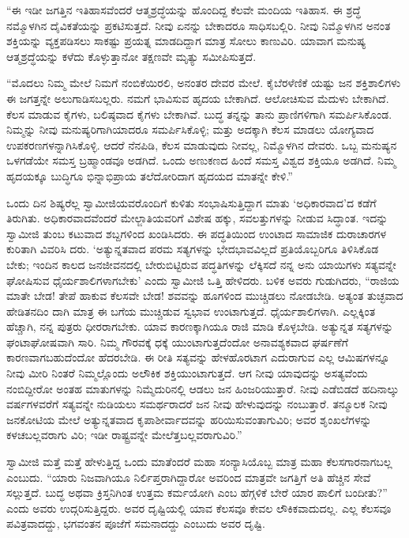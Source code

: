 “ಈ ಇಡೀ ಜಗತ್ತಿನ ಇತಿಹಾಸವೆಂದರೆ ಆತ್ಮಶ್ರದ್ಧೆಯನ್ನು ಹೊಂದಿದ್ದ ಕೆಲವೇ ಮಂದಿಯ ಇತಿಹಾಸ. ಈ ಶ್ರದ್ಧೆ ನಮ್ಮೊಳಗಿನ ದೈವಿಕತೆಯನ್ನು ಪ್ರಕಟಿಸುತ್ತದೆ. ನೀವು ಏನನ್ನು ಬೇಕಾದರೂ ಸಾಧಿಸಬಲ್ಲಿರಿ. ನೀವು ನಿಮ್ಮೊಳಗಿನ ಅನಂತ ಶಕ್ತಿಯನ್ನು ವ್ಯಕ್ತಪಡಿಸಲು ಸಾಕಷ್ಟು ಪ್ರಯತ್ನ ಮಾಡದಿದ್ದಾಗ ಮಾತ್ರ ಸೋಲು ಕಾಣುವಿರಿ. ಯಾವಾಗ ಮನುಷ್ಯ ಆತ್ಮಶ್ರದ್ಧೆಯನ್ನು ಕಳೆದು ಕೊಳ್ಳುತ್ತಾನೋ ತಕ್ಷಣವೇ ಮೃತ್ಯು ಸಮೀಪಿಸುತ್ತದೆ.

“ಮೊದಲು ನಿಮ್ಮ ಮೇಲೆ ನಿಮಗೆ ನಂಬಿಕೆಯಿರಲಿ, ಅನಂತರ ದೇವರ ಮೇಲೆ. ಕೈಬೆರಳೆಣಿಕೆ ಯಷ್ಟು ಜನ ಶಕ್ತಿಶಾಲಿಗಳು ಈ ಜಗತ್ತನ್ನೇ ಅಲುಗಾಡಿಸಬಲ್ಲರು. ನಮಗೆ ಭಾವಿಸುವ ಹೃದಯ ಬೇಕಾಗಿದೆ. ಆಲೋಚಿಸುವ ಮೆದುಳು ಬೇಕಾಗಿದೆ. ಕೆಲಸ ಮಾಡುವ ಕೈಗಳು, ಬಲಿಷ್ಠವಾದ ಕೈಗಳು ಬೇಕಾಗಿವೆ. ಬುದ್ಧ ತನ್ನನ್ನು ತಾನು ಪ್ರಾಣಿಗಳಿಗಾಗಿ ಸಮರ್ಪಿಸಿಕೊಂಡ. ನಿಮ್ಮನ್ನು ನೀವು ಮನುಷ್ಯರಿಗಾಗಿಯಾದರೂ ಸಮರ್ಪಿಸಿಕೊಳ್ಳಿ; ಮತ್ತು ಅದಕ್ಕಾಗಿ ಕೆಲಸ ಮಾಡಲು ಯೋಗ್ಯವಾದ ಉಪಕರಣಗಳನ್ನಾಗಿಸಿಕೊಳ್ಳಿ. ಆದರೆ ನೆನಪಿಡಿ, ಕೆಲಸ ಮಾಡುವುದು ನೀವಲ್ಲ, ನಿಮ್ಮೊಳಗಿನ ದೇವರು. ಒಬ್ಬ ಮನುಷ್ಯನ ಒಳಗಡೆಯೇ ಸಮಸ್ತ ಬ್ರಹ್ಮಾಂಡವೂ ಅಡಗಿದೆ. ಒಂದು ಅಣುಕಣದ ಹಿಂದೆ ಸಮಸ್ತ ವಿಶ್ವದ ಶಕ್ತಿಯೂ ಅಡಗಿದೆ. ನಿಮ್ಮ ಹೃದಯಕ್ಕೂ ಬುದ್ಧಿಗೂ ಭಿನ್ನಾಭಿಪ್ರಾಯ ತಲೆದೋರಿದಾಗ ಹೃದಯದ ಮಾತನ್ನೇ ಕೇಳಿ.”

ಒಂದು ದಿನ ಶಿಷ್ಯರೆಲ್ಲ ಸ್ವಾಮೀಜಿಯವರೊಂದಿಗೆ ಕುಳಿತು ಸಂಭಾಷಿಸುತ್ತಿದ್ದಾಗ ಮಾತು ‘ಅಧಿಕಾರವಾದ’ದ ಕಡೆಗೆ ತಿರುಗಿತು. ಅಧಿಕಾರವಾದವೆಂದರೆ ಮೇಲ್ಜಾತಿಯವರಿಗೆ ವಿಶೇಷ ಹಕ್ಕು, ಸವಲತ್ತುಗಳನ್ನು ನೀಡುವ ಸಿದ್ಧಾಂತ. ಇದನ್ನು ಸ್ವಾಮೀಜಿ ತುಂಬ ಕಟುವಾದ ಶಬ್ದಗಳಿಂದ ಖಂಡಿಸಿದರು. ಈ ಪದ್ಧತಿಯಿಂದ ಉಂಟಾದ ಸಾಮಾಜಿಕ ದುರಾಚಾರಗಳ ಕುರಿತಾಗಿ ವಿವರಿಸಿ ದರು. ‘ಅತ್ಯುನ್ನತವಾದ ಪರಮ ಸತ್ಯಗಳನ್ನು ಭೇದಭಾವವಿಲ್ಲದೆ ಪ್ರತಿಯೊಬ್ಬರಿಗೂ ತಿಳಿಸಿಕೊಡ ಬೇಕು; ಇಂದಿನ ಕಾಲದ ಜನಜೀವನದಲ್ಲಿ ಬೇರುಬಿಟ್ಟಿರುವ ಪದ್ಧತಿಗಳನ್ನು ಲೆಕ್ಕಿಸದೆ ನನ್ನ ಅನು ಯಾಯಿಗಳು ಸತ್ಯವನ್ನೇ ಘೋಷಿಸುವ ಧೈರ್ಯಶಾಲಿಗಳಾಗಬೇಕು’ ಎಂದು ಸ್ವಾಮೀಜಿ ಒತ್ತಿ ಹೇಳಿದರು. ಬಳಿಕ ಅವರು ಗುಡುಗಿದರು, “ರಾಜಿಯ ಮಾತೇ ಬೇಡ! ತೇಪೆ ಹಾಕುವ ಕೆಲಸವೇ ಬೇಡ! ಶವವನ್ನು ಹೂಗಳಿಂದ ಮುಚ್ಚಿಡಲು ನೋಡಬೇಡಿ. ಅತ್ಯಂತ ತುಚ್ಛವಾದ ಹೇಡಿತನದಿಂ ದಾಗಿ ಮಾತ್ರ ಈ ಬಗೆಯ ಮುಚ್ಚಿಡುವ ಸ್ವಭಾವ ಉಂಟಾಗುತ್ತದೆ. ಧೈರ್ಯಶಾಲಿಗಳಾಗಿ. ಎಲ್ಲಕ್ಕಿಂತ ಹೆಚ್ಚಾಗಿ, ನನ್ನ ಪುತ್ರರು ಧೀರರಾಗಬೇಕು. ಯಾವ ಕಾರಣಕ್ಕಾಗಿಯೂ ರಾಜಿ ಮಾಡಿ ಕೊಳ್ಳಬೇಡಿ. ಅತ್ಯುನ್ನತ ಸತ್ಯಗಳನ್ನು ಘಂಟಾಘೋಷವಾಗಿ ಸಾರಿ. ನಿಮ್ಮ ಗೌರವಕ್ಕೆ ಧಕ್ಕೆ ಯುಂಟಾಗುತ್ತದೆಂದೋ ಅನಾವಶ್ಯಕವಾದ ಘರ್ಷಣೆಗೆ ಕಾರಣವಾಗಬಹುದೆಂದೋ ಹೆದರಬೇಡಿ. ಈ ರೀತಿ ಸತ್ಯವನ್ನು ಹೇಳಹೊರಟಾಗ ಎದುರಾಗುವ ಎಲ್ಲ ಆಮಿಷಗಳನ್ನೂ ನೀವು ಮೀರಿ ನಿಂತರೆ ನಿಮ್ಮಲ್ಲೊಂದು ಅಲೌಕಿಕ ಶಕ್ತಿಯುಂಟಾಗುತ್ತದೆ. ಆಗ ನೀವು ಯಾವುದನ್ನು ಅಸತ್ಯವೆಂದು ನಂಬಿದ್ದೀರೋ ಅಂತಹ ಮಾತುಗಳನ್ನು ನಿಮ್ಮೆದುರಿನಲ್ಲಿ ಆಡಲು ಜನ ಹಿಂಜರಿಯುತ್ತಾರೆ. ನೀವು ಎಡೆಬಿಡದೆ ಹದಿನಾಲ್ಕು ವರ್ಷಗಳವರೆಗೆ ಸತ್ಯವನ್ನೇ ನುಡಿಯಲು ಸಮರ್ಥರಾದರೆ ಜನ ನೀವು ಹೇಳುವುದನ್ನು ನಂಬುತ್ತಾರೆ. ತನ್ಮೂಲಕ ನೀವು ಜನಕೋಟಿಯ ಮೇಲೆ ಅತ್ಯುನ್ನತವಾದ ಕೃಪಾಶೀರ್ವಾದವನ್ನು ಹರಿಯಿಸುವಂತಾಗುವಿರಿ; ಅವರ ಶೃಂಖಲೆಗಳನ್ನು ಕಳಚಬಲ್ಲವರಾಗು ವಿರಿ; ಇಡೀ ರಾಷ್ಟ್ರವನ್ನೇ ಮೇಲೆತ್ತಬಲ್ಲವರಾಗುವಿರಿ.”

ಸ್ವಾಮೀಜಿ ಮತ್ತೆ ಮತ್ತೆ ಹೇಳುತ್ತಿದ್ದ ಒಂದು ಮಾತೆಂದರೆ ಮಹಾ ಸಂನ್ಯಾಸಿಯೊಬ್ಬ ಮಾತ್ರ ಮಹಾ ಕೆಲಸಗಾರನಾಗಬಲ್ಲ ಎಂಬುದು. “ಯಾರು ನಿಜವಾಗಿಯೂ ನಿರ್ಲಿಪ್ತರಾಗಿದ್ದಾರೋ ಅವರಿಂದ ಮಾತ್ರವೇ ಜಗತ್ತಿಗೆ ಅತಿ ಹೆಚ್ಚಿನ ಸೇವೆ ಸಲ್ಲುತ್ತದೆ. ಬುದ್ಧ ಅಥವಾ ಕ್ರಿಸ್ತನಿಗಿಂತ ಉತ್ತಮ ಕರ್ಮಯೋಗಿ ಎಂಬ ಹೆಗ್ಗಳಿಕೆ ಬೇರೆ ಯಾರ ಪಾಲಿಗೆ ಬಂದೀತು?” ಎಂದು ಅವರು ಉದ್ಗರಿಸುತ್ತಿದ್ದರು. ಅವರ ದೃಷ್ಟಿಯಲ್ಲಿ ಯಾವ ಕೆಲಸವೂ ಕೇವಲ ಲೌಕಿಕವಾದುದಲ್ಲ. ಎಲ್ಲ ಕೆಲಸವೂ ಪವಿತ್ರವಾದದ್ದು, ಭಗವಂತನ ಪೂಜೆಗೆ ಸಮನಾದದ್ದು ಎಂಬುದು ಅವರ ದೃಷ್ಟಿ.

